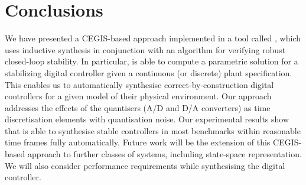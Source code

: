\documentclass{sig-alternate-05-2015}
\begin{document}

\section{Conclusions} \label{sec:conclusions}

We have presented a CEGIS-based approach implemented in a tool called \tool, 
which uses inductive synthesis in conjunction with an algorithm for verifying 
robust closed-loop stability. In particular, \tool is able to compute a parametric solution 
for a stabilizing digital controller given a continuous (or discrete) plant 
specification.  This enables us to automatically synthesise correct-by-construction 
digital controllers for a given model of their physical environment.  
Our approach addresses the effects of the quantisers (A/D and D/A converters) 
as time discretisation elements with quantisation noise.  Our experimental results 
show that \tool is able to synthesise stable controllers in most benchmarks within
reasonable time frames fully automatically.
%
%
Future work will be the extension of this CEGIS-based approach to further
classes of systems, including state-space representation.  
We will also consider performance requirements while
synthesising the digital controller.


  

\end{document}
